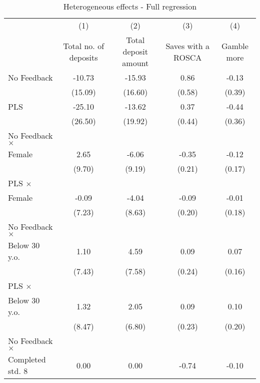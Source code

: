 \begin{table}[htbp]\centering
\def\sym#1{\ifmmode^{#1}\else\(^{#1}\)\fi}
\caption{Heterogeneous effects - Full regression}
\begin{tabular}{l*{4}{c}}
\toprule
                &\multicolumn{1}{c}{(1)}&\multicolumn{1}{c}{(2)}&\multicolumn{1}{c}{(3)}&\multicolumn{1}{c}{(4)}\\
                &\multicolumn{1}{c}{Total no. of deposits}&\multicolumn{1}{c}{Total deposit amount}&\multicolumn{1}{c}{Saves with a ROSCA}&\multicolumn{1}{c}{Gamble more}\\
\midrule
No Feedback     &   -10.73         &   -15.93         &     0.86         &    -0.13         \\
                &  (15.09)         &  (16.60)         &   (0.58)         &   (0.39)         \\
\addlinespace
PLS             &   -25.10         &   -13.62         &     0.37         &    -0.44         \\
                &  (26.50)         &  (19.92)         &   (0.44)         &   (0.36)         \\
\addlinespace
No Feedback $\times$ \\ Female&     2.65         &    -6.06         &    -0.35         &    -0.12         \\
                &   (9.70)         &   (9.19)         &   (0.21)         &   (0.17)         \\
\addlinespace
PLS $\times$ \\ Female&    -0.09         &    -4.04         &    -0.09         &    -0.01         \\
                &   (7.23)         &   (8.63)         &   (0.20)         &   (0.18)         \\
\addlinespace
No Feedback $\times$ \\ Below 30 y.o.&     1.10         &     4.59         &     0.09         &     0.07         \\
                &   (7.43)         &   (7.58)         &   (0.24)         &   (0.16)         \\
\addlinespace
PLS $\times$ \\ Below 30 y.o.&     1.32         &     2.05         &     0.09         &     0.10         \\
                &   (8.47)         &   (6.80)         &   (0.23)         &   (0.20)         \\
\addlinespace
No Feedback $\times$ \\ Completed std. 8&     0.00         &     0.00         &    -0.74         &    -0.10         \\

\end{tabular}
\end{table}
